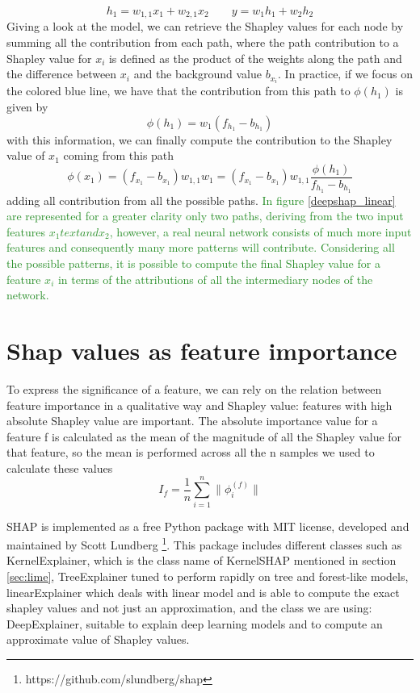 \documentclass[11pt]{report}
\begin{document}
\[
h_1 = w_{1, 1}x_1 + w_{2, 1}x_2 \qquad y = w_1 h_1 + w_2 h_2
\]
Giving a look at the model, we can retrieve the Shapley values for each node by summing all the contribution from each path, where the path contribution to a Shapley value for $x_i$ is defined as the product of the weights along the path and the difference between $x_i$ and the background value $b_{x_i}$.
In practice, if we focus on the colored blue line, we have that the contribution from this path to $\phi(h_1)$ is given by
\[
\phi(h_1) = w_1 (f_{h_1} - b_{h_1})
\]
with this information, we can finally compute the contribution to the Shapley value of $x_1$ coming from this path
\begin{equation}
\phi(x_1) = (f_{x_1} - b_{x_1}) w_{1, 1} w_1 = (f_{x_1} - b_{x_1}) w_{1, 1} \frac{\phi(h_1)}{f_{h_1} - b_{h_1}}
\end{equation}
adding all contribution from all the possible paths.
\textcolor{ForestGreen}{
In figure \ref{deepshap_linear} are represented for a greater clarity only two paths, deriving from the two input features $x_1 text{and} x_2$, however, a real neural network consists of much more input features and consequently many more patterns will contribute.
Considering all the possible patterns, it is possible to compute the final Shapley value for a feature $x_i$ in terms of the attributions of all the intermediary nodes of the network.
}


\section{Shap values as feature importance}

To express the significance of a feature, we can rely on the relation between feature importance in a qualitative way and Shapley value: features with high absolute Shapley value are important.
The absolute importance value for a feature f is calculated as the mean of the magnitude of all the Shapley value for that feature, so the mean is performed across all the n samples we used to calculate these values
\begin{equation}\label{eq:shap_magnitude}
I_f = \frac{1}{n} \sum_{i = 1}^n \|\phi_i^{(f)}\|
\end{equation}

SHAP is implemented as a free Python package with MIT license, developed and maintained by Scott Lundberg \footnote{https://github.com/slundberg/shap}.
This package includes different classes such as KernelExplainer, which is the class name of KernelSHAP mentioned in section \ref{sec:lime}, TreeExplainer tuned to perform rapidly on tree and forest-like models, linearExplainer which deals with linear model and is able to compute the exact shapley values and not just an approximation, and the class we are using: DeepExplainer, suitable to explain deep learning models and to compute an approximate value of Shapley values.
\end{document}
